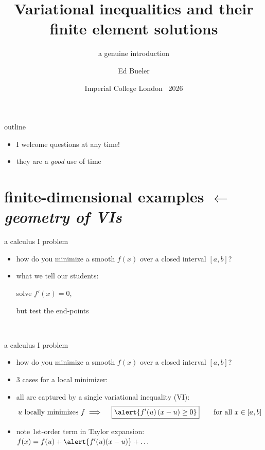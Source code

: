 \documentclass[aspectratio=169,10pt]{beamer}
\title{Variational inequalities and their finite element solutions}
\subtitle{a genuine introduction}
\author{Ed Bueler}
\institute{University of Alaska Fairbanks}
\date{Imperial College London \, 2026}
\begin{document}
\begin{frame}
  \titlepage
\end{frame}

\begin{frame}{outline}
  \tableofcontents
\end{frame}

\begin{frame}[standout]
\begin{itemize}
\item I welcome questions at any time!
\item they are a \emph{good} use of time
\end{itemize}
\end{frame}


\section[finite-dimensional examples]{finite-dimensional examples \hfill {\small \texorpdfstring{$\leftarrow$}{←} \emph{geometry of VIs}}}

\begin{frame}{a calculus I problem}

\begin{itemize}
\item how do you minimize a smooth $f(x)$ over a closed interval $[a,b]$?
\item what we tell our students:

\bigskip \bigskip
\quad solve $f'(x)=0$,

\quad but test the end-points

\vspace{-13mm}
\mbox{\hspace{40mm} }
\end{itemize}
\end{frame}


\begin{frame}{a calculus I problem}

\begin{itemize}
\item how do you minimize a smooth $f(x)$ over a closed interval $[a,b]$?
\item 3 cases for a local minimizer:

\medskip
  \centering
  

\pause
\raggedright

\bigskip
\item all are captured by a single \alert{variational inequality} (VI):
  $$u \text{ locally minimizes } f \implies \quad \boxed{\alert{f'(u)\,(x-u) \ge 0}} \qquad \text{for all } x\in[a,b]$$

\smallskip
\item note 1st-order term in Taylor expansion: \, $f(x) = f(u) + \alert{f'(u) (x-u)} + \dots$

\medskip
{}
\end{itemize}
\end{frame}
\end{document}

